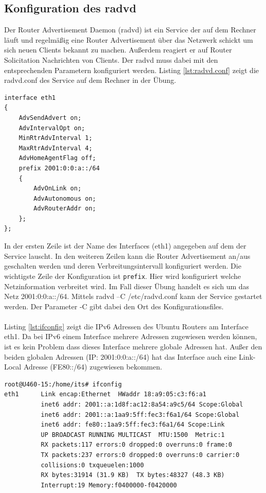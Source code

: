 \documentclass[a4paper,12pt]{article} %
\begin{document}
\subsection{Konfiguration des radvd}
Der Router Advertisement Daemon (radvd) ist ein Service der auf dem Rechner läuft und regelmäßig eine Router Advertisement über das Netzwerk schickt um sich neuen Clients bekannt zu machen. Außerdem reagiert er auf Router Solicitation Nachrichten von Clients. Der radvd muss dabei mit den entsprechenden Parametern konfiguriert werden. Listing \ref{lst:radvd.conf} zeigt die radvd.conf des Service auf dem Rechner in der Übung.

\begin{lstlisting}[style=code,caption={radvd.conf},label=lst:radvd.conf]
interface eth1
{
	AdvSendAdvert on;
	AdvIntervalOpt on;
	MinRtrAdvInterval 1;
	MaxRtrAdvInterval 4;
	AdvHomeAgentFlag off;
	prefix 2001:0:0:a::/64
	{
		AdvOnLink on;
		AdvAutonomous on;
		AdvRouterAddr on;
	};
};
\end{lstlisting}

In der ersten Zeile ist der Name des Interfaces (eth1) angegeben auf dem der Service lauscht. In den weiteren Zeilen kann die Router Advertisement an/aus geschalten werden und deren Verbreitungsintervall konfiguriert werden. Die wichtigste Zeile der Konfiguration ist \verb!prefix!. Hier wird konfiguriert welche Netzinformation verbreitet wird. Im Fall dieser Übung handelt es sich um das Netz 2001:0:0:a::/64.
Mittels radvd –C /etc/radvd.conf kann der Service gestartet werden. Der Parameter -C gibt dabei den Ort des Konfigurationsfiles.

\paragraph{}
Listing \ref{lst:ifconfig} zeigt die IPv6 Adressen des Ubuntu Routers am Interface eth1. Da bei IPv6 einem Interface mehrere Adressen zugewiesen werden können, ist es kein Problem dass dieses Interface mehrere globale Adressen hat. Außer den beiden globalen Adressen (IP: 2001:0:0:a::/64) hat das Interface auch eine Link-Local Adresse (FE80::/64) zugewiesen bekommen.

\begin{lstlisting}[style=code,caption={ifconfig des Ubuntu Routers},label=lst:ifconfig]
root@U460-15:/home/its# ifconfig
eth1      Link encap:Ethernet  HWaddr 18:a9:05:c3:f6:a1  
          inet6 addr: 2001::a:1d8f:ac12:8a54:a9c5/64 Scope:Global
          inet6 addr: 2001::a:1aa9:5ff:fec3:f6a1/64 Scope:Global
          inet6 addr: fe80::1aa9:5ff:fec3:f6a1/64 Scope:Link
          UP BROADCAST RUNNING MULTICAST  MTU:1500  Metric:1
          RX packets:117 errors:0 dropped:0 overruns:0 frame:0
          TX packets:237 errors:0 dropped:0 overruns:0 carrier:0
          collisions:0 txqueuelen:1000 
          RX bytes:31914 (31.9 KB)  TX bytes:48327 (48.3 KB)
          Interrupt:19 Memory:f0400000-f0420000
\end{lstlisting}
\end{document}
